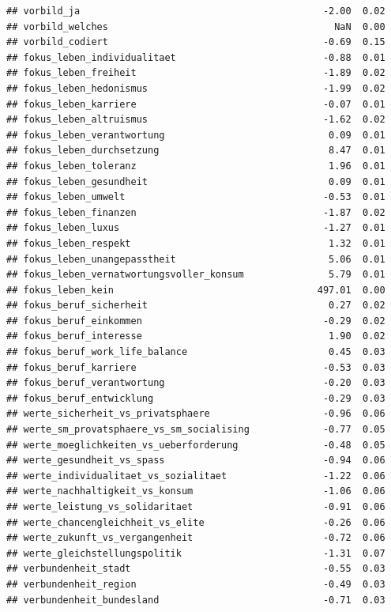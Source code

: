 \documentclass[
]{book}
\begin{document}
\begin{verbatim}
## vorbild_ja                                           -2.00  0.02
## vorbild_welches                                        NaN  0.00
## vorbild_codiert                                      -0.69  0.15
## fokus_leben_individualitaet                          -0.88  0.01
## fokus_leben_freiheit                                 -1.89  0.02
## fokus_leben_hedonismus                               -1.99  0.02
## fokus_leben_karriere                                 -0.07  0.01
## fokus_leben_altruismus                               -1.62  0.02
## fokus_leben_verantwortung                             0.09  0.01
## fokus_leben_durchsetzung                              8.47  0.01
## fokus_leben_toleranz                                  1.96  0.01
## fokus_leben_gesundheit                                0.09  0.01
## fokus_leben_umwelt                                   -0.53  0.01
## fokus_leben_finanzen                                 -1.87  0.02
## fokus_leben_luxus                                    -1.27  0.01
## fokus_leben_respekt                                   1.32  0.01
## fokus_leben_unangepasstheit                           5.06  0.01
## fokus_leben_vernatwortungsvoller_konsum               5.79  0.01
## fokus_leben_kein                                    497.01  0.00
## fokus_beruf_sicherheit                                0.27  0.02
## fokus_beruf_einkommen                                -0.29  0.02
## fokus_beruf_interesse                                 1.90  0.02
## fokus_beruf_work_life_balance                         0.45  0.03
## fokus_beruf_karriere                                 -0.53  0.03
## fokus_beruf_verantwortung                            -0.20  0.03
## fokus_beruf_entwicklung                              -0.29  0.03
## werte_sicherheit_vs_privatsphaere                    -0.96  0.06
## werte_sm_provatsphaere_vs_sm_socialising             -0.77  0.05
## werte_moeglichkeiten_vs_ueberforderung               -0.48  0.05
## werte_gesundheit_vs_spass                            -0.94  0.06
## werte_individualitaet_vs_sozialitaet                 -1.22  0.06
## werte_nachhaltigkeit_vs_konsum                       -1.06  0.06
## werte_leistung_vs_solidaritaet                       -0.91  0.06
## werte_chancengleichheit_vs_elite                     -0.26  0.06
## werte_zukunft_vs_vergangenheit                       -0.72  0.06
## werte_gleichstellungspolitik                         -1.31  0.07
## verbundenheit_stadt                                  -0.55  0.03
## verbundenheit_region                                 -0.49  0.03
## verbundenheit_bundesland                             -0.71  0.03

\end{verbatim}
\end{document}
